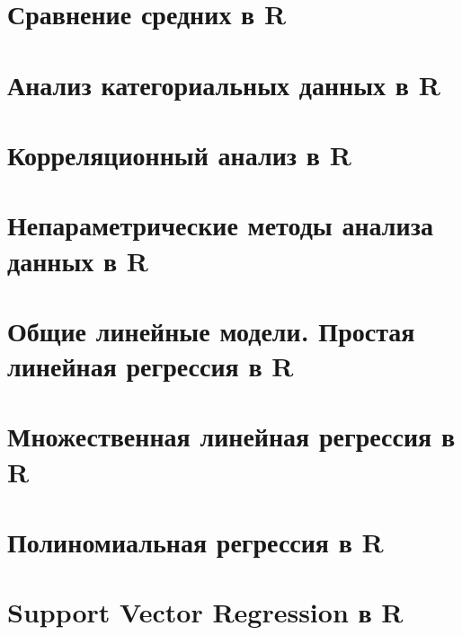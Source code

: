\documentclass[
  letterpaper,
  DIV=11,
  numbers=noendperiod]{scrreprt}
\theoremstyle{definition}
\theoremstyle{remark}
\begin{document}
\chapter{Сравнение средних в R}\label{randan-ttest}


\chapter{Анализ категориальных данных в R}\label{randan-chisq}


\chapter{Корреляционный анализ в R}\label{randan-corr}


\chapter{Непараметрические методы анализа данных в
R}\label{randan-nonparam}


\chapter{Общие линейные модели. Простая линейная регрессия в
R}\label{randan-simplelinear}


\chapter{Множественная линейная регрессия в
R}\label{randan-multiplelinear}


\chapter{Полиномиальная регрессия в R}\label{randan-polynomial}


\chapter{Support Vector Regression в R}\label{randan-svr}
\end{document}
